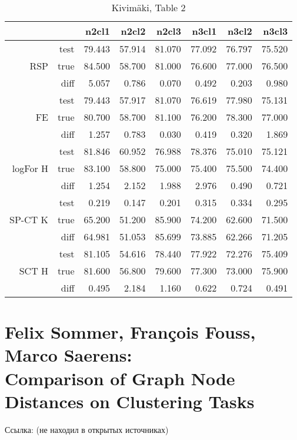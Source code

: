 \documentclass{article}
\begin{document}
\begin{table}[H]
\centering
\caption{Kivim{\"a}ki, Table 2}
\label{my-label}
\begin{tabular}{rr|rrrrrr}
         &      & n2cl1  & n2cl2  & n2cl3  & n3cl1  & n3cl2  & n3cl3 \\
         \hline
         & test & 79.443 & 57.914 & 81.070 & 77.092 & 76.797 & 75.520 \\
RSP      & true & 84.500 & 58.700 & 81.000 & 76.600 & 77.000 & 76.500 \\
         & diff & 5.057  & 0.786  & 0.070  & 0.492  & 0.203  & 0.980  \\
         \hline
         & test & 79.443 & 57.917 & 81.070 & 76.619 & 77.980 & 75.131 \\
FE       & true & 80.700 & 58.700 & 81.100 & 76.200 & 78.300 & 77.000 \\
         & diff & 1.257  & 0.783  & 0.030  & 0.419  & 0.320  & 1.869  \\
         \hline
         & test & 81.846 & 60.952 & 76.988 & 78.376 & 75.010 & 75.121 \\
logFor H & true & 83.100 & 58.800 & 75.000 & 75.400 & 75.500 & 74.400 \\
         & diff & 1.254  & 2.152  & 1.988  & 2.976  & 0.490  & 0.721  \\
         \hline
         & test & 0.219  & 0.147  & 0.201  & 0.315  & 0.334  & 0.295  \\
SP-CT K  & true & 65.200 & 51.200 & 85.900 & 74.200 & 62.600 & 71.500 \\
         & diff & \cellcolor{red!25} 64.981 & \cellcolor{red!25} 51.053 & \cellcolor{red!25} 85.699 &
                  \cellcolor{red!25} 73.885 & \cellcolor{red!25} 62.266 & \cellcolor{red!25} 71.205 \\
         \hline
         & test & 81.105 & 54.616 & 78.440 & 77.922 & 72.276 & 75.409 \\
SCT H    & true & 81.600 & 56.800 & 79.600 & 77.300 & 73.000 & 75.900 \\
         & diff & 0.495  & 2.184  & 1.160  & 0.622  & 0.724  & 0.491  
\end{tabular}
\end{table}


\section{Felix Sommer, Fran{\c c}ois Fouss, Marco Saerens:\\
         Comparison of Graph Node Distances on Clustering Tasks}
Ссылка: (не находил в открытых источниках)
\end{document}
